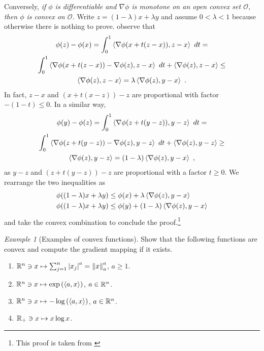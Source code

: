 \documentclass[12pt,a4paper]{amsart}
\theoremstyle{plain}%
\theoremstyle{definition}
\theoremstyle{remark}
\newtheorem{example}{Example}
\begin{document}
Conversely, \emph{if $\phi$ is differentiable and $\nabla \phi$ is monotone on an open convex set $\mathcal O$, then $\phi$ is convex on $\mathcal O$.} Write $z = (1-\lambda)x + \lambda y$ and assume $0 < \lambda < 1$ because otherwise there is nothing to prove. observe that
\begin{multline*}
  \phi(z) - \phi(x) = \int_0^1 \scalarof {\nabla\phi(x + t (z-x))}{z-x} \ dt = \\
  \int_0^1 \scalarof {\nabla\phi(x + t (z-x)) - \nabla\phi(z)}{z-x} \ dt + \scalarof{\nabla\phi(z)}{z-x} \leq \\ \scalarof{\nabla\phi(z)}{z-x} = \lambda \scalarof{\nabla\phi(z)}{y-x} \ .
\end{multline*}
In fact, $z-x$ and $(x + t(x-z)) - z$ are proportional with factor $-(1-t) \leq 0$. In a similar way,
\begin{multline*}
  \phi(y) - \phi(z) = \int_0^1 \scalarof {\nabla\phi(z + t  (y-z))}{y-z} \ dt = \\
  \int_0^1 \scalarof {\nabla\phi(z + t (y-z))-\nabla\phi(z)}{y-z} \ dt + \scalarof{\nabla\phi(z)}{y-z} \geq \\ \scalarof{\nabla\phi(z)}{y-z} = (1-\lambda) \scalarof{\nabla\phi(z)}{y-x}\ ,
\end{multline*}
as $y-z$ and $(z+t(y-z)) - z$ are proportional with a factor $t \geq 0$. We rearrange the two inequalities as
\begin{align*}
  \phi((1-\lambda)x+\lambda y) &\leq \phi(x) + \lambda \scalarof{\nabla\phi(z)}{y-x} \\
  \phi((1-\lambda)x+\lambda y) &\leq \phi(y) + (1-\lambda) \scalarof{\nabla\phi(z)}{y-x} 
\end{align*}
and take the convex combination to conclude the proof.\footnote{This proof is taken from \cite[p. 26]{rockafellar:1970}}

\begin{example}[Examples of convex functions]
Show that the following functions are convex and compute the gradient mapping if it exists.
\begin{enumerate}
\item $\reals^n \ni x \mapsto \sum_{j=1}^n \aval{x_j}^a = \normat a x ^ a$, $a \geq 1$.
\item $\reals^n \ni x \mapsto \expof{\scalarof a x}$, $a \in \reals^n$.
\item $\reals^n \ni x \mapsto -\logof{\scalarof a x}$, $a \in \reals^n$.
\item $\reals_+ \ni x \mapsto x\log x$.
\end{enumerate}

\end{example}
\end{document}
